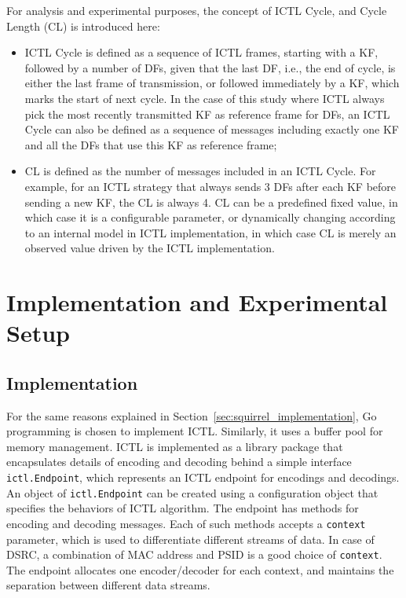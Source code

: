 \documentclass[12pt]{report}
\begin{document}
For analysis and experimental purposes, the concept of ICTL Cycle, and Cycle Length (CL) is introduced here:
\begin{itemize}
  \item ICTL Cycle is defined as a sequence of ICTL frames, starting with a KF, followed by a number of DFs, given that the last DF, i.e., the end of cycle, is either the last frame of transmission, or followed immediately by a KF, which marks the start of next cycle. In the case of this study where ICTL always pick the most recently transmitted KF as reference frame for DFs, an ICTL Cycle can also be defined as a sequence of messages including exactly one KF and all the DFs that use this KF as reference frame;
  \item CL is defined as the number of messages included in an ICTL Cycle. For example, for an ICTL strategy that always sends 3 DFs after each KF before sending a new KF, the CL is always 4. CL can be a predefined fixed value, in which case it is a configurable parameter, or dynamically changing according to an internal model in ICTL implementation, in which case CL is merely an observed value driven by the ICTL implementation.
\end{itemize}

\section{Implementation and Experimental Setup}

\subsection{Implementation}

For the same reasons explained in Section~\ref{sec:squirrel_implementation}, Go programming is chosen to implement ICTL. Similarly, it uses a buffer pool for memory management. ICTL is implemented as a library package that encapsulates details of encoding and decoding behind a simple interface \texttt{ictl.Endpoint}, which represents an ICTL endpoint for encodings and decodings. An object of \texttt{ictl.Endpoint} can be created using a configuration object that specifies the behaviors of ICTL algorithm. The endpoint has methods for encoding and decoding messages. Each of such methods accepts a \texttt{context} parameter, which is used to differentiate different streams of data. In case of DSRC, a combination of MAC address and PSID is a good choice of \texttt{context}. The endpoint allocates one encoder/decoder for each context, and maintains the separation between different data streams.
\end{document}
